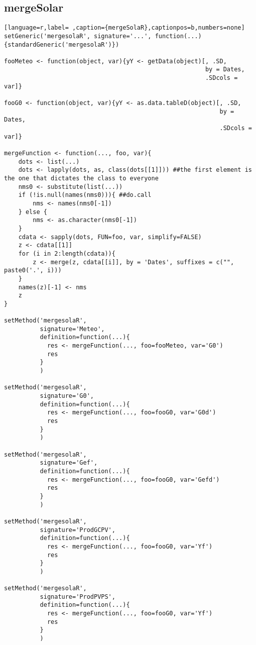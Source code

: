 \subsection{mergeSolar}
\label{sec:orga92acbf}
\label{subsec:mergesolar}
\begin{lstlisting}[language=r,label= ,caption={mergeSolaR},captionpos=b,numbers=none]
setGeneric('mergesolaR', signature='...', function(...){standardGeneric('mergesolaR')})

fooMeteo <- function(object, var){yY <- getData(object)[, .SD,
                                                        by = Dates,
                                                        .SDcols = var]}

fooG0 <- function(object, var){yY <- as.data.tableD(object)[, .SD,
                                                            by = Dates,
                                                            .SDcols = var]}

mergeFunction <- function(..., foo, var){
    dots <- list(...)
    dots <- lapply(dots, as, class(dots[[1]])) ##the first element is the one that dictates the class to everyone
    nms0 <- substitute(list(...))
    if (!is.null(names(nms0))){ ##do.call
        nms <- names(nms0[-1])
    } else { 
        nms <- as.character(nms0[-1])
    }
    cdata <- sapply(dots, FUN=foo, var, simplify=FALSE)
    z <- cdata[[1]]
    for (i in 2:length(cdata)){
        z <- merge(z, cdata[[i]], by = 'Dates', suffixes = c("", paste0('.', i)))
    }
    names(z)[-1] <- nms
    z
}

setMethod('mergesolaR',
          signature='Meteo',
          definition=function(...){
            res <- mergeFunction(..., foo=fooMeteo, var='G0')
            res
          }
          )

setMethod('mergesolaR',
          signature='G0',
          definition=function(...){
            res <- mergeFunction(..., foo=fooG0, var='G0d')
            res
          }
          )

setMethod('mergesolaR',
          signature='Gef',
          definition=function(...){
            res <- mergeFunction(..., foo=fooG0, var='Gefd')
            res
          }
          )

setMethod('mergesolaR',
          signature='ProdGCPV',
          definition=function(...){
            res <- mergeFunction(..., foo=fooG0, var='Yf')
            res
          }
          )

setMethod('mergesolaR',
          signature='ProdPVPS',
          definition=function(...){
            res <- mergeFunction(..., foo=fooG0, var='Yf')
            res
          }
          )
\end{lstlisting}

